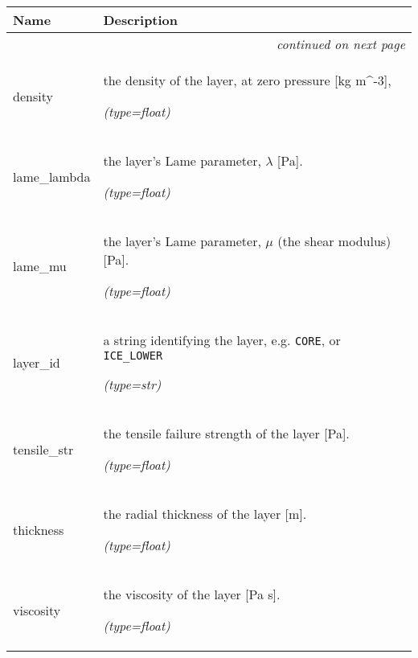     \vspace{-1cm}
\hspace{\varindent}\begin{longtable}{|p{\varnamewidth}|p{\vardescrwidth}|l}
\cline{1-2}
\cline{1-2} \centering \textbf{Name} & \centering \textbf{Description}& \\
\cline{1-2}
\endhead\cline{1-2}\multicolumn{3}{r}{\small\textit{continued on next page}}\\\endfoot\cline{1-2}
\endlastfoot\raggedright d\-e\-n\-s\-i\-t\-y\- & \raggedright the density of the layer, at zero pressure [kg 
          m{\textasciicircum}-3],

            {\it (type=float)}&\\
\cline{1-2}
\raggedright l\-a\-m\-e\-\_\-l\-a\-m\-b\-d\-a\- & \raggedright the layer's Lame parameter, \(\lambda\) [Pa].

            {\it (type=float)}&\\
\cline{1-2}
\raggedright l\-a\-m\-e\-\_\-m\-u\- & \raggedright the layer's Lame parameter, \(\mu\) (the shear modulus) [Pa].

            {\it (type=float)}&\\
\cline{1-2}
\raggedright l\-a\-y\-e\-r\-\_\-i\-d\- & \raggedright a string identifying the layer, e.g. \texttt{CORE}, or 
          \texttt{ICE\_LOWER}

            {\it (type=str)}&\\
\cline{1-2}
\raggedright t\-e\-n\-s\-i\-l\-e\-\_\-s\-t\-r\- & \raggedright the tensile failure strength of the layer [Pa].

            {\it (type=float)}&\\
\cline{1-2}
\raggedright t\-h\-i\-c\-k\-n\-e\-s\-s\- & \raggedright the radial thickness of the layer [m].

            {\it (type=float)}&\\
\cline{1-2}
\raggedright v\-i\-s\-c\-o\-s\-i\-t\-y\- & \raggedright the viscosity of the layer [Pa s].

            {\it (type=float)}&\\
\cline{1-2}
\end{longtable}



